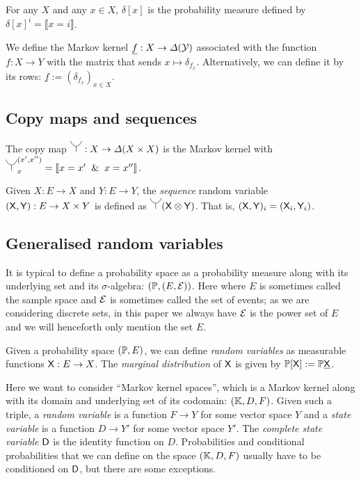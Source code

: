 For any $X$ and any $x\in X$, $\delta[x]$ is the probability measure defined by $\delta[x]^i = \llbracket x=i \rrbracket$.

We define the Markov kernel $\underline{f}:X\to \Delta(\mathcal{Y})$ associated with the function $f:X\to Y$ with the matrix that sends $x\mapsto \delta_{f_x}$. Alternatively, we can define it by its rows: $\underline{f}:=(\delta_{f_x})_{x\in X}$.

\subsection{Copy maps and sequences}

The copy map $\splitter{0.2}:X\to \Delta(X\times X)$ is the Markov kernel with $\splitter{0.2}_x^{(x',x'')}=\llbracket x=x' \And x=x'' \rrbracket$.

Given $X:E\to X$ and $Y:E\to Y$, the \emph{sequence} random variable $(\mathsf{X},\mathsf{Y}):E\to X\times Y$ is defined as $\splitter{0.2}(\RV{X}\otimes \RV{Y})$. That is, $(\mathsf{X},\mathsf{Y})_i = (\mathsf{X}_i,\mathsf{Y}_i)$.

\subsection{Generalised random variables}

It is typical to define a probability space as a probability measure along with its underlying set and its $\sigma$-algebra: $(\mathbb{P},(E,\mathcal{E}))$. Here where $E$ is sometimes called the sample space and $\mathcal{E}$ is sometimes called the set of events; as we are considering discrete sets, in this paper we always have $\mathcal{E}$ is the power set of $E$ and we will henceforth only mention the set $E$.

Given a probability space $(\mathbb{P},E)$, we can define \emph{random variables} as measurable functions $\mathsf{X}:E\to X$. The \emph{marginal distribution} of $\mathsf{X}$ is given by $\mathbb{P}[\mathsf{X}]:=\mathbb{P}\underline{\mathsf{X}}$. 

Here we want to consider ``Markov kernel spaces'', which is a Markov kernel along with its domain and underlying set of its codomain: $(\mathbb{K},D,F)$. Given such a triple, a \emph{random variable} is a function $F\to Y$ for some vector space $Y$ and a \emph{state variable} is a function $D\to Y'$ for some vector space $Y'$. The \emph{complete state variable} $\mathsf{D}$ is the identity function on $D$. Probabilities and conditional probabilities that we can define on the space $(\mathbb{K},D,F)$ usually have to be conditioned on $\mathsf{D}$, but there are some exceptions.

